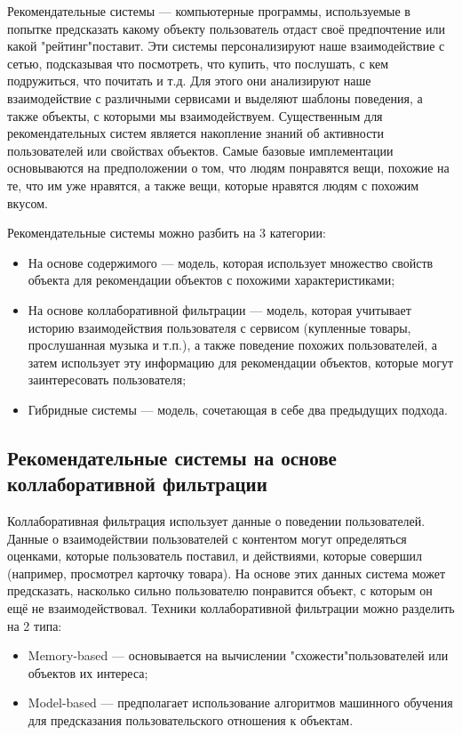 Рекомендательные системы --- компьютерные программы, используемые в попытке предсказать какому объекту пользователь отдаст своё предпочтение или какой "рейтинг"\space поставит.
Эти системы персонализируют наше взаимодействие с сетью, подсказывая что посмотреть, что купить, что послушать, с кем подружиться, что почитать и т.д. Для этого они анализируют наше взаимодействие с различными сервисами и выделяют шаблоны поведения, а также объекты, с которыми мы взаимодействуем.
Существенным для рекомендательных систем является накопление знаний об активности пользователей или свойствах объектов.
Самые базовые имплементации основываются на предположении о том, что людям понравятся вещи, похожие на те, что им уже нравятся, а также вещи, которые нравятся людям с похожим вкусом.

Рекомендательные системы можно разбить на 3 категории:
\begin{itemize}
\item На основе содержимого --- модель, которая использует множество свойств объекта для рекомендации объектов с похожими характеристиками;
\item На основе коллаборативной фильтрации --- модель, которая учитывает историю взаимодействия пользователя с сервисом (купленные товары, прослушанная музыка и т.п.), а также поведение похожих пользователей, а затем использует эту информацию для рекомендации объектов, которые могут заинтересовать пользователя;
\item Гибридные системы --- модель, сочетающая в себе два предыдущих подхода.
\end{itemize}

\subsection{Рекомендательные системы на основе \\коллаборативной фильтрации}\label{subsec:collaborative_rec_systems}
Коллаборативная фильтрация использует данные о поведении пользователей.
Данные о взаимодействии пользователей с контентом могут определяться оценками, которые пользователь поставил, и действиями, которые совершил (например, просмотрел карточку товара).
На основе этих данных система может предсказать, насколько сильно пользователю понравится объект, с которым он ещё не взаимодействовал.
Техники коллаборативной фильтрации можно разделить на 2 типа:
\begin{itemize}
\item Memory-based --- основывается на вычислении "схожести"\space пользователей или объектов их интереса;
\item Model-based --- предполагает использование алгоритмов машинного обучения для предсказания пользовательского отношения к объектам.
\end{itemize}
